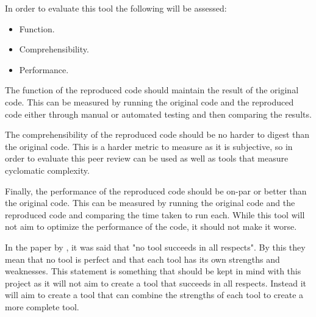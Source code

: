 In order to evaluate this tool the following will be assessed:
\begin{itemize}
	\item Function.
	\item Comprehensibility.
	\item Performance.
\end{itemize}
The function of the reproduced code should maintain the result of the original code. This can be measured by running the original code and the reproduced code either through manual or automated testing and then comparing the results.

The comprehensibility of the reproduced code should be no harder to digest than the original code. This is a harder metric to measure as it is subjective, so in order to evaluate this peer review can be used as well as tools that measure cyclomatic complexity.

Finally, the performance of the reproduced code should be on-par or better than the original code. This can be measured by running the original code and the reproduced code and comparing the time taken to run each. While this tool will not aim to optimize the performance of the code, it should not make it worse.

In the paper by \cite{8681007}, it was said that "no tool succeeds in all respects". By this they mean that no tool is perfect and that each tool has its own strengths and weaknesses. This statement is something that should be kept in mind with this project as it will not aim to create a tool that succeeds in all respects. Instead it will aim to create a tool that can combine the strengths of each tool to create a more complete tool.
